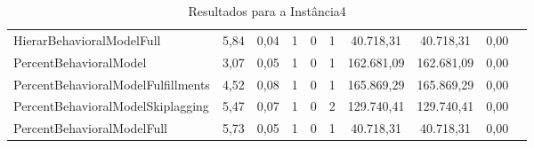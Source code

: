\begin{table}[H]
{\begin{tabular}{lccccccccc}
            HierarBehavioralModelFull & 5,84 & 0,04 & 1 & 0 & 1 & 40.718,31 & 40.718,31 & 0,00 \\
            PercentBehavioralModel & 3,07 & 0,05 & 1 & 0 & 1 & 162.681,09 & 162.681,09 & 0,00 \\
            PercentBehavioralModelFulfillments & 4,52 & 0,08 & 1 & 0 & 1 & 165.869,29 & 165.869,29 & 0,00 \\
            PercentBehavioralModelSkiplagging & 5,47 & 0,07 & 1 & 0 & 2 & 129.740,41 & 129.740,41 & 0,00 \\
            PercentBehavioralModelFull & 5,73 & 0,05 & 1 & 0 & 1 & 40.718,31 & 40.718,31 & 0,00 \\ \hline
        \end{tabular}%
    }
    \caption{Resultados para a Instância4}
    \label{tab:resultado_instancia4}
\end{table}


